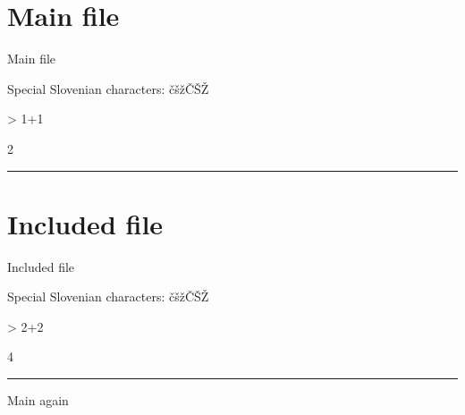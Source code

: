 \documentclass[a4paper,12pt]{article}
\begin{document}
\section{Main file}
Main file

Special Slovenian characters: čšžČŠŽ

\begin{Schunk}
\begin{Sinput}
> 1+1
\end{Sinput}
\begin{Soutput}
[1] 2
\end{Soutput}
\end{Schunk}

\hrule
\usepackage[utf8]{inputenc} %

\section{Included file}
Included file

Special Slovenian characters: čšžČŠŽ

\begin{Schunk}
\begin{Sinput}
> 2+2
\end{Sinput}
\begin{Soutput}
[1] 4
\end{Soutput}
\end{Schunk}

\hrule

Main again
\end{document}
